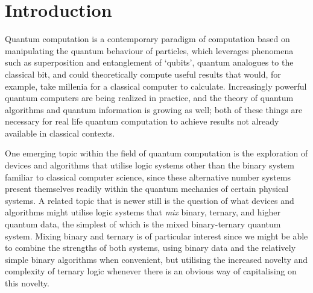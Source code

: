 




\chapter*{Introduction}

Quantum computation is a contemporary paradigm of computation based on manipulating the quantum behaviour of particles, which leverages phenomena such as superposition and entanglement of `qubits', quantum analogues to the classical bit, and could theoretically compute useful results that would, for example, take millenia for a classical computer to calculate. Increasingly powerful quantum computers are being realized in practice, and the theory of quantum algorithms and quantum information is growing as well; both of these things are necessary for real life quantum computation to achieve results not already available in classical contexts.

One emerging topic within the field of quantum computation is the exploration of devices and algorithms that utilise logic systems other than the binary system familiar to classical computer science, since these alternative number systems present themselves readily within the quantum mechanics of certain physical systems. A related topic that is newer still is the question of what devices and algorithms might utilise logic systems that \emph{mix} binary, ternary, and higher quantum data, the simplest of which is the mixed binary-ternary quantum system. Mixing binary and ternary is of particular interest since we might be able to combine the strengths of both systems, using binary data and the relatively simple binary algorithms when convenient, but utilising the increased novelty and complexity of ternary logic whenever there is an obvious way of capitalising on this novelty.

